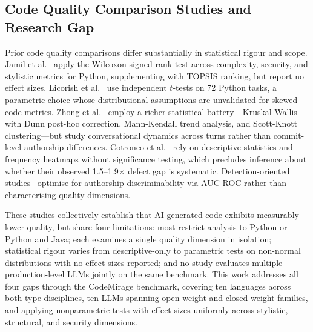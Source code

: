 \subsection{Code Quality Comparison Studies and Research Gap}
\label{sec:related-work-stats}

Prior code quality comparisons differ substantially in statistical rigour and scope. Jamil et al.~\cite{jamil2025can} apply the Wilcoxon signed-rank test across complexity, security, and stylistic metrics for Python, supplementing with TOPSIS ranking, but report no effect sizes. Licorish et al.~\cite{licorish2025comparing} use independent $t$-tests on 72 Python tasks, a parametric choice whose distributional assumptions are unvalidated for skewed code metrics. Zhong et al.~\cite{zhong2025developer} employ a richer statistical battery---Kruskal-Wallis with Dunn post-hoc correction, Mann-Kendall trend analysis, and Scott-Knott clustering---but study conversational dynamics across turns rather than commit-level authorship differences. Cotroneo et al.~\cite{cotroneo2025} rely on descriptive statistics and frequency heatmaps without significance testing, which precludes inference about whether their observed 1.5--1.9$\times$ defect gap is systematic. Detection-oriented studies~\cite{xu2024distinguishing, rahman2024automatic} optimise for authorship discriminability via AUC-ROC rather than characterising quality dimensions.

These studies collectively establish that AI-generated code exhibits measurably lower quality, but share four limitations: most restrict analysis to Python or Python and Java; each examines a single quality dimension in isolation; statistical rigour varies from descriptive-only to parametric tests on non-normal distributions with no effect sizes reported; and no study evaluates multiple production-level LLMs jointly on the same benchmark. This work addresses all four gaps through the CodeMirage benchmark, covering ten languages across both type disciplines, ten LLMs spanning open-weight and closed-weight families, and applying nonparametric tests with effect sizes uniformly across stylistic, structural, and security dimensions.
